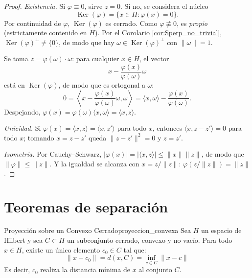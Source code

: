 \documentclass[11pt, a4paper]{article}
\begin{document}
\begin{proof}
\textit{Existencia.} Si $\varphi \equiv 0$, sirve $z = 0$. Si no, se considera el núcleo
$$ \operatorname{Ker}(\varphi) = \{ x \in H : \varphi(x) = 0 \}. $$
Por continuidad de $\varphi$, $\operatorname{Ker}(\varphi)$ es cerrado.
Como $\varphi \not\equiv 0$, es \emph{propio} (estrictamente contenido en $H$).
Por el Corolario \ref{cor:Sperp_no_trivial}, $\operatorname{Ker}(\varphi)^\perp \ne \{0\}$,
de modo que hay $\omega \in \operatorname{Ker}(\varphi)^\perp$ con $\|\omega\| = 1$.

Se toma $z = \varphi(\omega) \cdot \omega$: para cualquier $x \in H$, el vector
$$ x - \frac{\varphi(x)}{\varphi(\omega)} \omega $$
está en $\operatorname{Ker}(\varphi)$, de modo que es ortogonal a
$\omega$:
$$ 0 = \left\langle x - \frac{\varphi(x)}{\varphi(\omega)} \omega, \omega \right\rangle = \langle x,
\omega \rangle - \frac{\varphi(x)}{\varphi(\omega)}. $$
Despejando, $\varphi(x) = \varphi(\omega) \langle x, \omega \rangle = \langle x, z \rangle$.

\textit{Unicidad.} Si $\varphi(x) = \langle x, z \rangle = \langle x, z' \rangle$ para todo $x$,
entonces $\langle x, z - z' \rangle = 0$ para todo $x$; tomando $x = z - z'$ queda
$\|z - z'\|^2 = 0$ y $z = z'$.

\textit{Isometría.} Por Cauchy--Schwarz, $|\varphi(x)| = |\langle x, z \rangle| \le \|x\| \|z\|$,
de modo que $\|\varphi\| \le \|z\|$. Y la igualdad se alcanza con $x = z/\|z\|$:
$\varphi(z/\|z\|) = \|z\|$.
\end{proof}

\newpage

\section{Teoremas de separación}

\begin{teorema}{Proyección sobre un Convexo Cerrado}{proyeccion_convexa}
Sea $H$ un espacio de Hilbert y sea $C \subset H$ un subconjunto cerrado, convexo y no vacío.
Para todo $x \in H$, existe un único elemento $c_0 \in C$ tal que:
$$ \|x - c_0\| = d(x, C) = \inf_{c \in C} \|x - c\| $$
Es decir, $c_0$ realiza la distancia mínima de $x$ al conjunto $C$.
\end{teorema}
\end{document}
